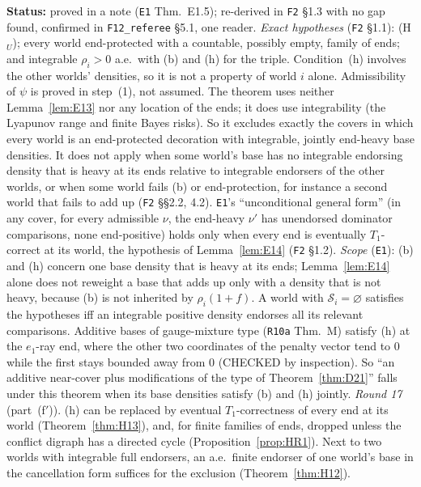 \documentclass[11pt]{article}
\theoremstyle{definition}
\theoremstyle{remark}
\newcommand{\src}[1]{\texttt{#1}}
\newcommand{\status}[1]{\par\smallskip\noindent\textbf{Status:} #1\par\smallskip}
\begin{document}
\status{proved in a note (\src{E1} Thm.~E1.5); re-derived in \src{F2} \S1.3 with no gap found, confirmed in \src{F12\_referee} \S5.1, one reader. \emph{Exact hypotheses} (\src{F2} \S1.1): (H$_U$); every world end-protected with a countable, possibly empty, family of ends; and integrable $\rho_i>0$ a.e.\ with (b) and (h) for the triple. Condition~(h) involves the other worlds' densities, so it is not a property of world $i$ alone. Admissibility of $\psi$ is proved in step~(1), not assumed. The theorem uses neither Lemma~\ref{lem:E13} nor any location of the ends; it does use integrability (the Lyapunov range and finite Bayes risks). So it excludes exactly the covers in which every world is an end-protected decoration with integrable, jointly end-heavy base densities. It does not apply when some world's base has no integrable endorsing density that is heavy at its ends relative to integrable endorsers of the other worlds, or when some world fails (b) or end-protection, for instance a second world that fails to add up (\src{F2} \S\S2.2, 4.2). \src{E1}'s ``unconditional general form'' (in any cover, for every admissible $\nu$, the end-heavy $\nu'$ has unendorsed dominator comparisons, none end-positive) holds only when every end is eventually $T_1$-correct at its world, the hypothesis of Lemma~\ref{lem:E14} (\src{F2} \S1.2). \emph{Scope} (\src{E1}): (b) and (h) concern one base density that is heavy at its ends; Lemma~\ref{lem:E14} alone does not reweight a base that adds up only with a density that is not heavy, because (b) is not inherited by $\rho_i(1+f)$. A world with $\mathcal S_i=\varnothing$ satisfies the hypotheses iff an integrable positive density endorses all its relevant comparisons. Additive bases of gauge-mixture type (\src{R10a} Thm.~M) satisfy (h) at the $e_1$-ray end, where the other two coordinates of the penalty vector tend to $0$ while the first stays bounded away from $0$ (CHECKED by inspection). So ``an additive near-cover plus modifications of the type of Theorem~\ref{thm:D21}'' falls under this theorem when its base densities satisfy (b) and (h) jointly. \emph{Round 17} (part~(f$'$)). (h) can be replaced by eventual $T_1$-correctness of every end at its world (Theorem~\ref{thm:H13}), and, for finite families of ends, dropped unless the conflict digraph has a directed cycle (Proposition~\ref{prop:HR1}). Next to two worlds with integrable full endorsers, an a.e.\ finite endorser of one world's base in the cancellation form suffices for the exclusion (Theorem~\ref{thm:H12}).}
\end{document}
